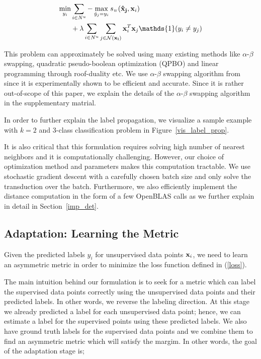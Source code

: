 \begin{equation}
\begin{aligned}
\min_{y_i}  &\sum_{i \in N^u} - \max_{\hat{y}_j=y_i}  \sw(\mathbf{\hat{x}_j},\mathbf{x}_{i}) \\
&+ \lambda
\sum_{i \in N^u} \sum_{j \in \mathcal{N}(\mathbf{x_i})} \mathbf{x}_i^T \mathbf{x}_j\mathds{1}(y_i \neq y_j)
\end{aligned}
\label{robtran}
\end{equation}

This problem can approximately be solved using many existing methods like $\alpha$-$\beta$ swapping, quadratic pseudo-boolean optimization (QPBO) and linear programming through roof-duality etc. We use $\alpha$-$\beta$ swapping algorithm from \cite{kolmogrovalphabeta} since it is experimentally shown to be efficient and accurate. Since it is rather out-of-scope of this paper, we explain the details of the $\alpha$-$\beta$ swapping algorithm in the supplementary matrial.

In order to further explain the label propagation, we visualize a sample example with $k=2$ and $3$-class classification problem in Figure~\ref{vis_label_prop}. 

It is also critical that this formulation requires solving high number of nearest neighbors and it is computationally challenging. However, our choice of optimization method and parameters makes this computation tractable. We use stochastic gradient descent with a carefully chosen batch size and only solve the transduction over the batch. Furthermore, we also efficiently implement the distance computation in the form of a few OpenBLAS calls as we further explain in detail in Section~\ref{imp_det}. 


\subsection{Adaptation: Learning the Metric}
\label{metric}
Given the predicted labels $y_i$ for unsupervised data points $\mathbf{x}_i$, we need to learn an asymmetric metric in order to minimize the loss function defined in (\ref{loss}). 

The main intuition behind our formulation is to seek for a metric which can label the supervised data points correctly using the unsupervised data points and their predicted labels. In other words, we reverse the labeling direction. At this stage we already predicted a label for each unsupervised data point; hence, we can estimate a label for the supervised points using these predicted labels. We also have ground truth labels for the supervised data points and we combine them to find an asymmetric metric which will satisfy the margim. In other words, the goal of the adaptation stage is;

